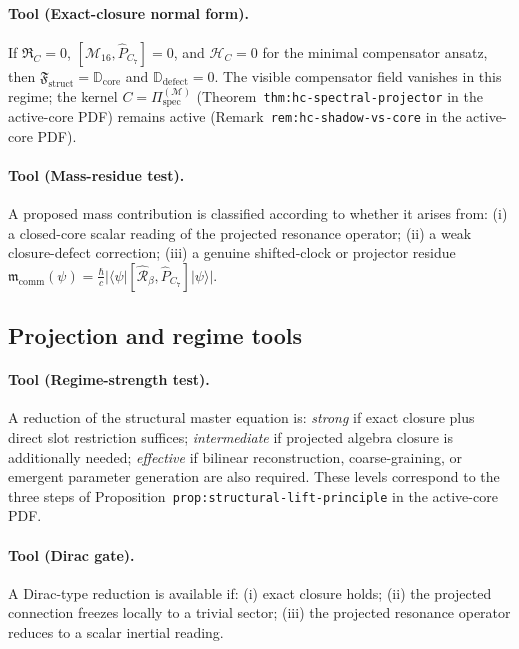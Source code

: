 \documentclass[12pt,a4paper]{article}
\begin{document}
\paragraph{Tool (Exact-closure normal form).}
If $\mathfrak{R}_C = 0$, $[\mathcal{M}_{16},\hat{P}_{C_7}] = 0$, and
$\mathcal{H}_C = 0$ for the minimal compensator ansatz, then
$\mathfrak{F}_{\mathrm{struct}} = \mathbb{D}_{\mathrm{core}}$ and
$\mathbb{D}_{\mathrm{defect}} = 0$.
The visible compensator field vanishes in this regime; the kernel
$C = \Pi^{(\mathcal{M})}_{\mathrm{spec}}$
(Theorem~\texttt{thm:hc-spectral-projector} in the active-core PDF) remains active
(Remark~\texttt{rem:hc-shadow-vs-core} in the active-core PDF).

\paragraph{Tool (Mass-residue test).}
A proposed mass contribution is classified according to whether it
arises from: (i) a closed-core scalar reading of the projected resonance
operator; (ii) a weak closure-defect correction; (iii) a genuine
shifted-clock or projector residue
$\mathfrak{m}_{\mathrm{comm}}(\psi)
= \frac{\hbar}{c}|\langle\psi|[\hat{\mathcal{R}}_\beta,\hat{P}_{C_7}]|\psi\rangle|$.

\subsection*{Projection and regime tools}

\paragraph{Tool (Regime-strength test).}
A reduction of the structural master equation is: \emph{strong} if
exact closure plus direct slot restriction suffices; \emph{intermediate}
if projected algebra closure is additionally needed; \emph{effective} if
bilinear reconstruction, coarse-graining, or emergent parameter
generation are also required.
These levels correspond to the three steps of
Proposition~\texttt{prop:structural-lift-principle} in the active-core PDF.

\paragraph{Tool (Dirac gate).}
A Dirac-type reduction is available if: (i) exact closure holds;
(ii) the projected connection freezes locally to a trivial sector;
(iii) the projected resonance operator reduces to a scalar inertial
reading.
\end{document}
